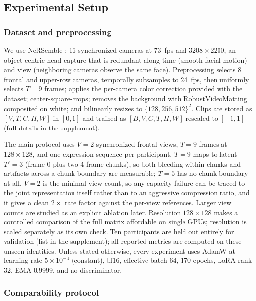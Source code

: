 \subsection{Experimental Setup}

\subsubsection{Dataset and preprocessing}

We use NeRSemble \cite{kirschstein2023nersemble}: 16 synchronized cameras at 73~fps and $3208{\times}2200$, an object-centric head capture that is redundant along time (smooth facial motion) and view (neighboring cameras observe the same face). Preprocessing selects 8 frontal and upper-row cameras, temporally subsamples to 24~fps, then uniformly selects $T{=}9$ frames; applies the per-camera color correction provided with the dataset; center-square-crops; removes the background with RobustVideoMatting \cite{lin2022robust} composited on white; and bilinearly resizes to $\{128, 256, 512\}^2$. Clips are stored as $[V, T, C, H, W]$ in $[0,1]$ and trained as $[B, V, C, T, H, W]$ rescaled to $[-1,1]$ (full details in the supplement).

The main protocol uses $V{=}2$ synchronized frontal views, $T{=}9$ frames at $128{\times}128$, and one expression sequence per participant. $T{=}9$ maps to latent $T'{=}3$ (frame 0 plus two 4-frame chunks), so both bleeding within chunks and artifacts across a chunk boundary are measurable; $T{=}5$ has no chunk boundary at all. $V{=}2$ is the minimal view count, so any capacity failure can be traced to the joint representation itself rather than to an aggressive compression ratio, and it gives a clean $2\times$ rate factor against the per-view references. Larger view counts are studied as an explicit ablation later. Resolution $128{\times}128$ makes a controlled comparison of the full matrix affordable on single GPUs; resolution is scaled separately as its own check. Ten participants are held out entirely for validation (list in the supplement); all reported metrics are computed on these unseen identities. Unless stated otherwise, every experiment uses AdamW at learning rate $5{\times}10^{-4}$ (constant), bf16, effective batch 64, 170 epochs, LoRA rank 32, EMA 0.9999, and no discriminator.

\subsubsection{Comparability protocol}

